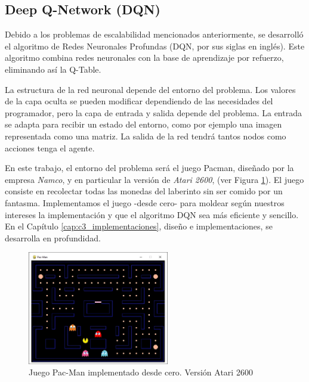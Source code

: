	\subsection{Deep Q-Network (DQN)}
	\label{cap:2_2_2}
		Debido a los problemas de escalabilidad mencionados anteriormente, se desarrolló el algoritmo de Redes Neuronales Profundas (DQN, por sus siglas en inglés). Este algoritmo combina redes neuronales con la base de aprendizaje por refuerzo, eliminando así la Q-Table.
		
		La estructura de la red neuronal depende del entorno del problema. Los valores de la capa oculta se pueden modificar dependiendo de las necesidades del programador, pero la capa de entrada y salida depende del problema. La entrada se adapta para recibir un estado del entorno, como por ejemplo una imagen representada como una matriz. La salida de la red tendrá tantos nodos como acciones tenga el agente. 
		
		En este trabajo, el entorno del problema será el juego Pacman, diseñado por la empresa \textit{Namco}, y en particular la versión de \textit{Atari 2600}, (ver Figura \ref{fig:pacman}). El juego consiste en recolectar todas las monedas del laberinto sin ser comido por un fantasma. Implementamos el juego -desde cero- para moldear según nuestros intereses la implementación y que el algoritmo DQN sea más eficiente y sencillo. En el Capítulo \ref{cap:c3_implementaciones}, diseño e implementaciones, se desarrolla en profundidad.
		
		\begin{figure}[!h]			
			\centering
			\includegraphics[width=0.55\textwidth]{images/chapter_2/pacman}	
			\caption{Juego Pac-Man implementado desde cero. Versión Atari 2600}
			\label{fig:pacman}
		\end{figure}
		
		
		

